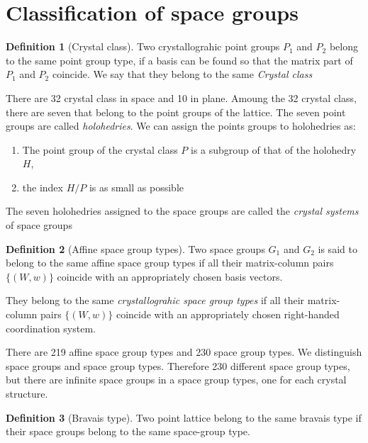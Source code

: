 \documentclass{amsart}
\theoremstyle{remark}
\theoremstyle{remark}
\theoremstyle{definition}
\newtheorem*{definition}{Definition}
\begin{document}
\vspace{10pt}
\section*{Classification of space groups}
\begin{definition}
    [Crystal class]
    Two crystallograhic point groups $P_1$ and $P_2$ belong to the same point group type, if a basis can be found 
    so that the matrix part of $P_1$ and $P_2$ coincide. We say that they belong to the same \emph{Crystal class}
\end{definition}
There are 32 crystal class in space and 10 in plane.
Amoung the 32 crystal class, there are seven that belong to the point groups of the lattice. The seven point groups 
are called \emph{holohedries}. We can assign the points groups to holohedries as:
\begin{enumerate}
    \item The point group of the crystal class $P$ is a subgroup of that of the holohedry $H$,
    \item the index $H/P$ is as small as possible
\end{enumerate}
The seven holohedries assigned to the space groups are called the \emph{crystal systems} of space groups

\vspace{10pt}

\begin{definition}
    [Affine space group types]
    Two space groups $G_1$ and $G_2$ is said to belong to the same affine space group types if 
    all their matrix-column pairs $\{(W,w)\}$ coincide with an appropriately chosen basis vectors. 
\end{definition}
They belong to the same \emph{crystallograhic space group types} if 
all their matrix-column pairs $\{(W,w)\}$ coincide with an appropriately chosen right-handed coordination system.

There are 219 affine space group types and 230 space group types. 
We distinguish space groups and space group types. Therefore 230 different space group types, but there are 
infinite space groups in a space group types, one for each crystal structure.

\begin{definition}
    [Bravais type]
    Two point lattice belong to the same bravais type if their space groups belong to the same space-group type.
\end{definition}
\end{document}
